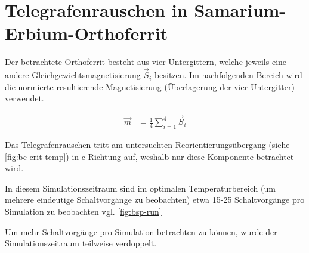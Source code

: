 \documentclass[main.tex]{subfiles}
\begin{document}
\newpage
\section{Telegrafenrauschen in Samarium-Erbium-Orthoferrit}



Der betrachtete Orthoferrit besteht aus vier Untergittern, welche jeweils eine andere Gleichgewichtsmagnetisierung \(\vec{S}_i\) besitzen. Im nachfolgenden Bereich wird die normierte resultierende Magnetisierung (Überlagerung der vier Untergitter) verwendet.

\begin{align}
    \vec{m} &= \frac{1}{4} \sum_{i=1}^4 \vec{S}_i
\end{align}

Das Telegrafenrauschen tritt am untersuchten Reorientierungsübergang (siehe \cref{fig:bc-crit-temp}) in c-Richtung auf, weshalb nur diese Komponente betrachtet wird.


In diesem Simulationszeitraum sind im optimalen Temperaturbereich (um mehrere eindeutige Schaltvorgänge zu beobachten) etwa 15-25 Schaltvorgänge pro Simulation zu beobachten vgl. \cref{fig:bsp-run}

Um mehr Schaltvorgänge pro Simulation betrachten zu können, wurde der Simulationszeitraum teilweise verdoppelt.
\end{document}
